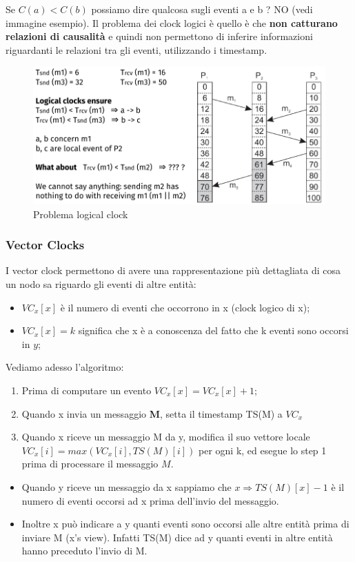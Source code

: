 \documentclass[12pt]{article}
\begin{document}
    		Se $C(a)<C(b)$ possiamo dire qualcosa sugli eventi a e b ? NO (vedi immagine esempio). Il problema dei clock logici è quello è che \textbf{non catturano relazioni di causalità} e quindi non permettono di inferire informazioni riguardanti le relazioni tra gli eventi, utilizzando i timestamp.
    		\begin{figure}[h!]
    			\centering
    			\includegraphics[scale=0.4]{img/lampex.png}
    			\caption{Problema logical clock}
    		\end{figure}
    	\subsubsection{Vector Clocks}
    		I vector clock permettono di avere una rappresentazione più dettagliata di cosa un nodo sa riguardo gli eventi di altre entità:
    		\begin{itemize}
    			\item $VC_x[x]$ è il numero di eventi che occorrono in x (clock logico di x);
    			\item $VC_x[x]=k$ significa che x è a conoscenza del fatto che k eventi sono occorsi in $y$;
    		\end{itemize}
    		Vediamo adesso l'algoritmo:
    		\begin{enumerate}
    			\item Prima di computare un evento $VC_x[x] = VC_x[x]+1$;
    			\item Quando x invia un messaggio \textbf{M}, setta il timestamp TS(M) a $VC_x$ 
    			\item Quando x riceve un messaggio M da y, modifica il suo vettore locale $VC_x[i] = max(VC_x[i],TS(M)[i])$ per ogni k, ed esegue lo step 1 prima di processare il messaggio $M$.
    		\end{enumerate}
    		\begin{itemize}
    			\item Quando y riceve un messaggio da x sappiamo che $x \Rightarrow TS(M)[x]-1$ è il numero di eventi occorsi ad x prima dell'invio del messaggio.
    			\item Inoltre x può indicare a y quanti eventi sono occorsi alle altre entità prima di inviare M (x's view). Infatti TS(M) dice ad y quanti eventi in altre entità hanno preceduto l'invio di M.
    		\end{itemize}
    	
\end{document}
